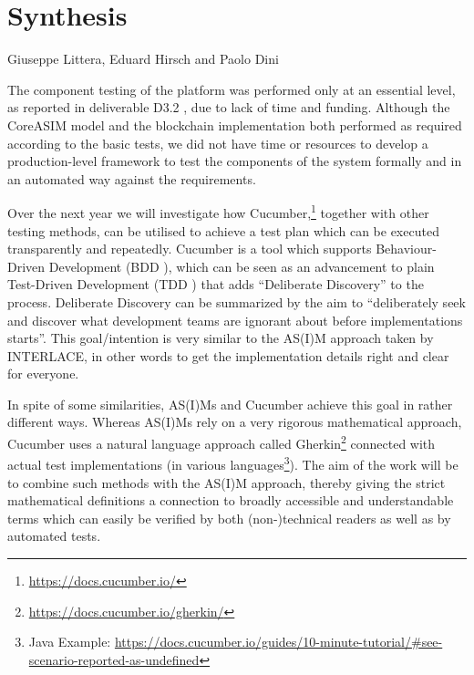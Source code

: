 \chapter{Synthesis}

\vspace{-1cm}
\begin{center}
Giuseppe Littera, Eduard Hirsch and Paolo Dini
\end{center}

The component testing of the platform was performed only at an essential level, as reported in deliverable D3.2 \cite{INTERLACE_D32}, due to lack of time and funding. Although the CoreASIM model and the blockchain implementation both performed as required according to the basic tests, we did not have time or resources to develop a production-level framework to test the components of the system formally and in an automated way against the requirements.

Over the next year we will investigate how Cucumber,\footnote{\url{https://docs.cucumber.io/}} together with other testing methods, can be utilised to achieve a test plan which can be executed transparently and repeatedly. Cucumber is a tool which supports Behaviour-Driven Development (BDD \cite{wynne2017cucumber}), which can be seen as an advancement to plain Test-Driven Development (TDD \cite{beck2003test}) that adds ``Deliberate Discovery'' to the process. Deliberate Discovery can be summarized by the aim to ``deliberately seek and discover what development teams are ignorant about before implementations starts''. This goal/intention is very similar to the AS(I)M approach taken by INTERLACE, in other words to get the implementation details right and clear for everyone.

In spite of some similarities, AS(I)Ms and Cucumber achieve this goal in rather different ways. Whereas AS(I)Ms rely on a very rigorous mathematical approach, Cucumber uses a natural language approach called Gherkin\footnote{\url{https://docs.cucumber.io/gherkin/}} connected with actual test implementations (in various languages\footnote{Java Example: \url{https://docs.cucumber.io/guides/10-minute-tutorial/\#see-scenario-reported-as-undefined}}). The aim of the work will be to combine such methods with the AS(I)M approach, thereby giving the strict mathematical definitions a connection to broadly accessible and understandable terms which can easily be verified by both (non-)technical readers as well as by automated tests.

